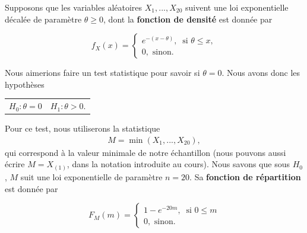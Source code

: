 \begin{questions}

\newpage
\question Supposons que les variables aléatoires $X_1,...,X_{20}$ suivent une loi exponentielle décalée de paramètre $\theta \geq0 $, dont la \textbf{fonction de densité} est donnée par 

 \begin{equation*}
  f_X(x) = \begin{cases}
         e^{-(x-\theta)},\ \text{  si  } \theta \leq x , \\
        0, \text{ sinon.}
        \end{cases}
 \end{equation*}

Nous aimerions faire un test statistique pour savoir si $\theta=0$. Nous avons donc les hypothèses

\begin{table}[ht]
    \centering
    \begin{tabular}{cc}
         $H_0: \theta=0$ & $H_1: \theta > 0$.
    \end{tabular}
\end{table}
Pour ce test, nous utiliserons la statistique
\begin{align*}
    M=\min (X_1,...,X_{20}),
\end{align*}
qui correspond à la valeur minimale de notre échantillon (nous pouvons aussi écrire $M=X_{(1)}$, dans la notation introduite au cours).
Nous savons que sous $H_0$, $M$ suit une loi exponentielle de paramètre $n=20$. Sa \textbf{fonction de répartition} est donnée par 

 \begin{equation*}
  F_M(m) = \begin{cases}
         1-e^{-20m},\ \text{  si  } 0\leq m \\
        0, \text{ sinon.}
        \end{cases}
 \end{equation*}


\end{questions}
